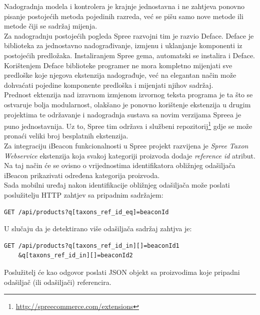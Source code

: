 Nadogradnja modela i kontrolera je krajnje jednostavna i ne zahtjeva ponovno pisanje postojećih metoda pojedinih razreda, već se pišu samo nove metode ili metode čiji se sadržaj mijenja.
\\
Za nadogradnju postojećih pogleda Spree razvojni tim je razvio Deface. 
Deface je biblioteka za jednostavno nadograđivanje, izmjenu i uklanjanje komponenti iz postojećih predložaka. 
Instaliranjem Spree gema, automatski se instalira i Deface. 
Korištenjem Deface biblioteke programer ne mora kompletno mijenjati sve predloške koje njegova ekstenzija nadograđuje, već na elegantan način može dohvaćati pojedine komponente predloška i mijenjati njihov sadržaj.
\\
Prednost ektenzija nad izravnom izmjenom izvornog teksta programa je ta što se ostvaruje bolja modularnost, olakšano je ponovno korištenje ekstenzija u drugim projektima te održavanje i nadogradnja sustava sa novim verzijama Spreea je puno jednostavnija. 
Uz to, Spree tim održava i službeni repozitorij\footnote{\url{http://spreecommerce.com/extensions}} gdje se može pronaći veliki broj besplatnih ekstenzija.
\\

Za integraciju iBeacon funkcionalnosti u Spree projekt razvijena je \textit{Spree Taxon Webservice} ekstenzija koja svakoj kategoriji proizvoda dodaje \textit{reference id} atribut. 
Na taj način će se ovisno o vrijednostima identifikatora obližnjeg odašiljača iBeacon prikazivati određena kategorija proizvoda.
\\

Sada mobilni uređaj nakon identifikacije obližnjeg odašiljača može poslati poslužitelju HTTP zahtjev sa pripadnim sadržajem:
\begin{lstlisting}
GET /api/products?q[taxons_ref_id_eq]=beaconId
\end{lstlisting}

U slučaju da je detektirano više odašiljača sadržaj zahtjva je:
\begin{lstlisting}
GET /api/products?q[taxons_ref_id_in][]=beaconId1
	&q[taxons_ref_id_in][]=beaconId2
\end{lstlisting}

Poslužitelj će kao odgovor poslati JSON objekt sa proizvodima koje pripadni odašiljač (ili odašiljači) referencira.

